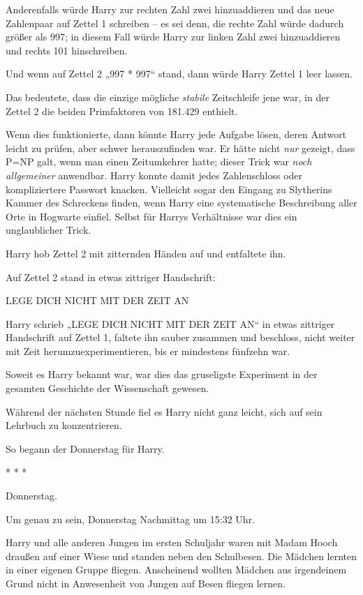 {Anderenfalls würde Harry zur rechten Zahl zwei hinzuaddieren und das neue Zahlenpaar auf Zettel 1 schreiben -- es sei denn, die rechte Zahl würde dadurch größer als 997; in diesem Fall würde Harry zur linken Zahl zwei hinzuaddieren und rechts 101 hinschreiben.

Und wenn auf Zettel 2 „997 * 997“ stand, dann würde Harry Zettel 1 leer lassen.

Das bedeutete, dass die einzige mögliche \emph{stabile} Zeitschleife jene war, in der Zettel 2 die beiden Primfaktoren von 181.429 enthielt.

Wenn dies funktionierte, dann könnte Harry jede Aufgabe lösen, deren Antwort leicht zu prüfen, aber schwer herauszufinden war. Er hätte nicht \emph{nur} gezeigt, dass P=NP galt, wenn man einen Zeitumkehrer hatte; dieser Trick war \emph{noch allgemeiner} anwendbar. Harry konnte damit jedes Zahlenschloss oder kompliziertere Passwort knacken. Vielleicht sogar den Eingang zu Slytherins Kammer des Schreckens finden, wenn Harry eine systematische Beschreibung aller Orte in Hogwarte einfiel. Selbst für Harrys Verhältnisse war dies ein unglaublicher Trick.

Harry hob Zettel 2 mit zitternden Händen auf und entfaltete ihn.

Auf Zettel 2 stand in etwas zittriger Handschrift:

LEGE DICH NICHT MIT DER ZEIT AN

Harry schrieb „LEGE DICH NICHT MIT DER ZEIT AN“ in etwas zittriger Handschrift auf Zettel 1, faltete ihn sauber zusammen und beschloss, nicht weiter mit Zeit herumzuexperimentieren, bis er mindestens fünfzehn war.

Soweit es Harry bekannt war, war dies das gruseligste Experiment in der gesamten Geschichte der Wissenschaft gewesen.

Während der nächsten Stunde fiel es Harry nicht ganz leicht, sich auf sein Lehrbuch zu konzentrieren.

So begann der Donnerstag für Harry.

* * *

Donnerstag.

Um genau zu sein, Donnerstag Nachmittag um 15:32 Uhr.

Harry und alle anderen Jungen im ersten Schuljahr waren mit Madam Hooch draußen auf einer Wiese und standen neben den Schulbesen. Die Mädchen lernten in einer eigenen Gruppe fliegen. Anscheinend wollten Mädchen aus irgendeinem Grund nicht in Anwesenheit von Jungen auf Besen fliegen lernen.

}
